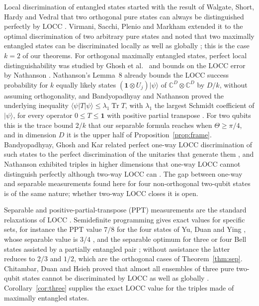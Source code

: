 \documentclass[11pt,a4paper]{article}
\theoremstyle{definition}
\theoremstyle{plain}
\DeclareMathOperator{\Tr}{Tr}
\newcommand{\ket}[1]{\lvert#1\rangle}
\newcommand{\bra}[1]{\langle#1\rvert}
\newcommand{\one}{\mathbf{1}}
\begin{document}
Local discrimination of entangled states started with the result of Walgate,
Short, Hardy and Vedral that two orthogonal pure states can always be
distinguished perfectly by LOCC \cite{Walgate2000}. Virmani, Sacchi, Plenio
and Markham extended it to the optimal discrimination of two arbitrary pure
states and noted that two maximally entangled states can be discriminated
locally as well as globally \cite{Virmani2001}; this is the case $k=2$ of our
theorems. For orthogonal maximally entangled states, perfect local
distinguishability was studied by Ghosh et al.\
\cite{Ghosh2001,Ghosh2004} and bounds on the LOCC error by Nathanson
\cite{Nathanson2005}. Nathanson's Lemma~8 already bounds the LOCC success
probability for $k$ equally likely states $(\one\otimes U_j)\ket\psi$ of
$\mathbb C^D\otimes\mathbb C^D$ by $D/k$, without assuming orthogonality, and
Bandyopadhyay and Nathanson proved the underlying inequality
$\bra\psi T\ket\psi\le\lambda_1\Tr T$, with $\lambda_1$ the largest Schmidt
coefficient of $\ket\psi$, for every operator $0\le T\le\one$ with positive
partial transpose \cite[Lemma~2]{BandyopadhyayNathanson2013}. For two qubits
this is the trace bound $2/k$ that our separable formula reaches when
$\Theta\ge\pi/4$, and in dimension $D$ it is the upper half of
Proposition~\ref{prop:frame}. Bandyopadhyay, Ghosh and Kar related perfect
one-way LOCC discrimination of such states to the perfect discrimination of
the unitaries that generate them \cite{Bandyopadhyay2011}, and Nathanson exhibited triples in
higher dimensions that one-way LOCC cannot distinguish perfectly although
two-way LOCC can \cite{Nathanson2013}. The gap between one-way and separable
measurements found here for four non-orthogonal two-qubit states is of the
same nature; whether two-way LOCC closes it is open.

Separable and positive-partial-transpose (PPT) measurements are the standard
relaxations of LOCC \cite{Chitambar2014}. Semidefinite programming gives exact
values for specific sets, for instance the PPT value $7/8$ for the four states
of Yu, Duan and Ying \cite{Yu2012,Cosentino2013}, whose separable value is
$3/4$ \cite{Bandyopadhyay2015}, and the separable optimum for
three or four Bell states assisted by a partially entangled pair
\cite{Bandyopadhyay2015}; without assistance the latter reduces to $2/3$ and
$1/2$, which are the orthogonal cases of Theorem~\ref{thm:sep}. Chitambar,
Duan and Hsieh proved that almost all ensembles of three pure two-qubit states
cannot be discriminated by LOCC as well as globally \cite{Chitambar2014b}.
Corollary~\ref{cor:three} supplies the exact LOCC value for the triples made
of maximally entangled states.
\end{document}
